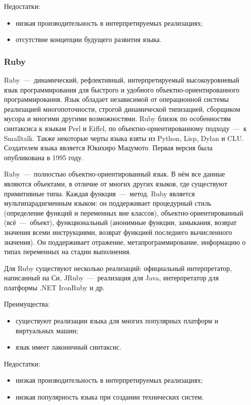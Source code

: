 Недостатки:
\begin{itemize}
	\item низкая производительность в интерпретируемых реализациях;
	\item отсутствие концепции будущего развития языка.~\cite{WikiPython}
\end{itemize}

\subsubsection{Ruby}
Ruby~---~динамический, рефлективный, интерпретируемый высокоуровневый язык программирования для быстрого и удобного объектно-ориентированного программирования. Язык обладает независимой от операционной системы реализацией многопоточности, строгой динамической типизацией, сборщиком мусора и многими другими возможностями. Ruby близок по особенностям синтаксиса к языкам Perl и Eiffel, по объектно-ориентированному подходу~---~к Smalltalk. Также некоторые черты языка взяты из Python, Lisp, Dylan и CLU. Создателем языка является Юкихиро Мацумото. Первая версия была опубликована в 1995 году.

Ruby~---~полностью объектно-ориентированный язык. В нём все данные являются объектами, в отличие от многих других языков, где существуют примитивные типы. Каждая функция~---~метод. Ruby является мультипарадигменным языком: он поддерживает процедурный стиль (определение функций и переменных вне классов), объектно-ориентированный (всё~---~объект), функциональный (анонимные функции, замыкания, возврат значения всеми инструкциями, возврат функцией последнего вычисленного значения). Он поддерживает отражение, метапрограммирование, информацию о типах переменных на стадии выполнения.

Для Ruby существуют несколько реализаций: официальный интерпретатор, написанный на Си, JRuby~---~реализация для Java, интерпретатор для платформы .NET IronRuby и др.

Преимущества:
\begin{itemize}
	\item существуют реализации языка для многих популярных платформ и виртуальных машин;
	\item язык имеет лаконичный синтаксис.
\end{itemize}

Недостатки:
\begin{itemize}
	\item низкая производительность в интерпретируемых реализациях;
	\item низкая популярность языка при создании технических систем.~\cite{WikiRuby}
\end{itemize}

